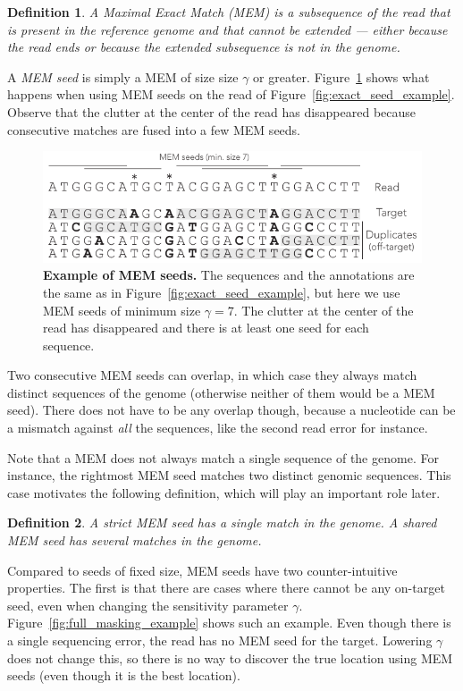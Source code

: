 \documentclass{article}
\newtheorem{definition}{Definition}
\begin{document}
\begin{definition}
A Maximal Exact Match (MEM) is a subsequence of the read that is present
in the reference genome and that cannot be extended --- either because the
read ends or because the extended subsequence is not in the genome.
\end{definition}

A \emph{MEM seed} is simply a MEM of size size $\gamma$ or greater.
Figure~\ref{fig:MEM_example} shows what happens when using MEM seeds on the
read of Figure~\ref{fig:exact_seed_example}. Observe that the clutter at the
center of the read has disappeared because consecutive matches are fused
into a few MEM seeds.

\begin{figure}[h]
\centering
\includegraphics[scale=1]{MEM_example.pdf}
\caption{\textbf{Example of MEM seeds.}
The sequences and the annotations are the same as in
Figure~\ref{fig:exact_seed_example}, but here we use MEM seeds of minimum
size $\gamma=7$. The clutter at the center of the read has disappeared and
there is at least one seed for each sequence.}
\label{fig:MEM_example}
\end{figure}

Two consecutive MEM seeds can overlap, in which case they always match
distinct sequences of the genome (otherwise neither of them would be a MEM
seed). There does not have to be any overlap though, because a nucleotide
can be a mismatch against \emph{all} the sequences, like the second read
error for instance.

Note that a MEM does not always match a single sequence of the genome. For
instance, the rightmost MEM seed matches two distinct genomic sequences.
This case motivates the following definition, which will play an important
role later.

\begin{definition}
A \emph{strict} MEM seed has a single match in the genome.
A \emph{shared} MEM seed has several matches in the genome.
\end{definition}

Compared to seeds of fixed size, MEM seeds have two counter-intuitive
properties. The first is that there are cases where there cannot be any
on-target seed, even when changing the sensitivity parameter $\gamma$.
Figure~\ref{fig:full_masking_example} shows such an example. Even though
there is a single sequencing error, the read has no MEM seed for the
target. Lowering $\gamma$ does not change this, so there is no way to
discover the true location using MEM seeds (even though it is the best
location).
\end{document}
